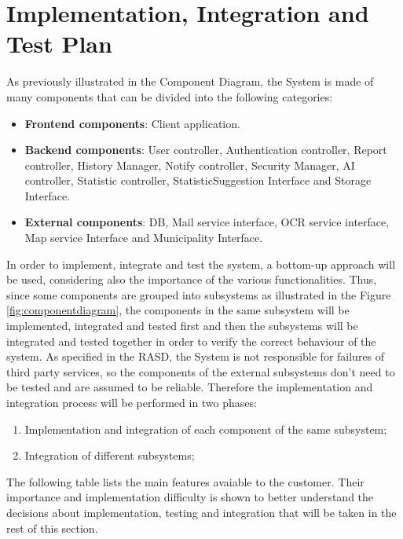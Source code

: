 \documentclass{report}
\begin{document}
\chapter{Implementation, Integration and Test Plan}
As previously illustrated in the Component Diagram, the System is made of many components that can be divided into the following categories:
\begin{itemize}
\item \textbf{Frontend components}: Client application.
\item \textbf{Backend components}: User controller, Authentication controller, Report controller, History Manager, Notify controller, Security Manager, AI controller, Statistic controller, StatisticSuggestion Interface and Storage Interface.
\item \textbf{External components}: DB, Mail service interface, OCR service interface, Map service Interface and Municipality Interface.
\end{itemize}
In order to implement, integrate and test the system, a bottom-up approach will be used, considering also the importance of the various functionalities. Thus, since some components are grouped into subsystems as illustrated in the Figure \ref{fig:componentdiagram}, the components in the same subsystem will be implemented, integrated and tested first and then the subsystems will be integrated and tested together in order to verify the correct behaviour of the system. As specified in the RASD, the System is not responsible for failures of third party services, so the components of the external subsystems don't need to be tested and are assumed to be reliable. Therefore the implementation and integration process will be performed in two phases:
\begin{enumerate}
\item Implementation and integration of each component of the same subsystem;
\item Integration of different subsystems;
\end{enumerate}
The following table lists the main features avaiable to the customer. Their importance and implementation difficulty is shown to better understand the decisions about implementation, testing and integration that will be taken in the rest of this section.
\clearpage
\end{document}
